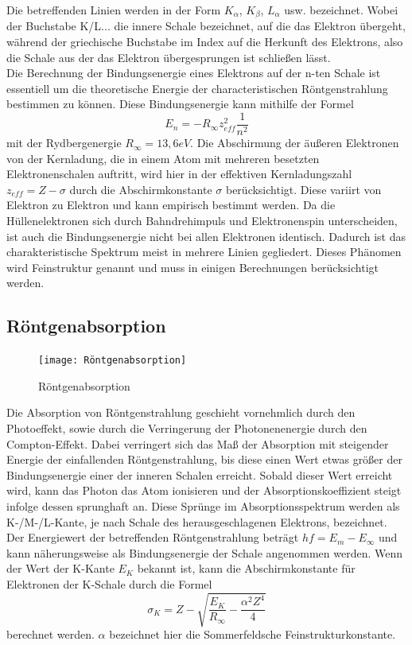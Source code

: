 Die betreffenden Linien werden in der Form $K_\alpha$, $K_\beta$, $L_\alpha$ usw. bezeichnet. Wobei der Buchstabe K/L... die innere Schale bezeichnet, auf die das Elektron übergeht, während der griechische Buchstabe im Index auf die Herkunft des Elektrons, also die Schale aus der das Elektron übergesprungen ist schließen lässt. \\
Die Berechnung der Bindungsenergie eines Elektrons auf der n-ten Schale ist essentiell um die theoretische Energie der characteristischen Röntgenstrahlung bestimmen zu können. Diese Bindungsenergie kann mithilfe der Formel
\begin{equation}
E_n=-R_{\infty}z_{eff}^2\frac{1}{n^2}
\end{equation}
mit der Rydbergenergie $R_{\infty}=13,6 eV$. Die Abschirmung der äußeren Elektronen von der Kernladung, die in einem Atom mit mehreren besetzten Elektronenschalen auftritt, wird hier in der effektiven Kernladungszahl $z_{eff}=Z-\sigma$ durch die Abschirmkonstante $\sigma$ berücksichtigt. Diese variirt von Elektron zu Elektron und kann empirisch bestimmt werden.
Da die Hüllenelektronen sich durch Bahndrehimpuls und Elektronenspin unterscheiden, ist auch die Bindungsenergie nicht bei allen Elektronen identisch. Dadurch ist das charakteristische Spektrum meist in mehrere Linien gegliedert. Dieses Phänomen wird Feinstruktur genannt und muss in einigen Berechnungen berücksichtigt werden.
\subsection{Röntgenabsorption}
\begin{figure}[h]
    \centering
    \texttt{[image: Röntgenabsorption]}
    \caption{Röntgenabsorption}
\end{figure}
Die Absorption von Röntgenstrahlung geschieht vornehmlich durch den Photoeffekt, sowie durch die Verringerung der Photonenenergie durch den Compton-Effekt. Dabei verringert sich das Maß der Absorption mit steigender Energie der einfallenden Röntgenstrahlung, bis diese einen Wert etwas größer der Bindungsenergie einer der inneren Schalen erreicht. Sobald dieser Wert erreicht wird, kann das Photon das Atom ionisieren und der Absorptionskoeffizient steigt infolge dessen sprunghaft an.
Diese Sprünge im Absorptionsspektrum werden als K-/M-/L-Kante, je nach Schale des herausgeschlagenen Elektrons, bezeichnet. Der Energiewert der betreffenden Röntgenstrahlung beträgt $hf=E_m-E_{\infty}$ und kann näherungsweise als Bindungsenergie der Schale angenommen werden. 
Wenn der Wert der K-Kante $E_K$ bekannt ist, kann die Abschirmkonstante für Elektronen der K-Schale durch die Formel
\begin{equation}
\sigma_K=Z-\sqrt{\frac{E_K}{R_{\infty}}-\frac{\alpha^2Z^4}{4}}
\end{equation}
berechnet werden. $\alpha$ bezeichnet hier die Sommerfeldsche Feinstrukturkonstante. 
